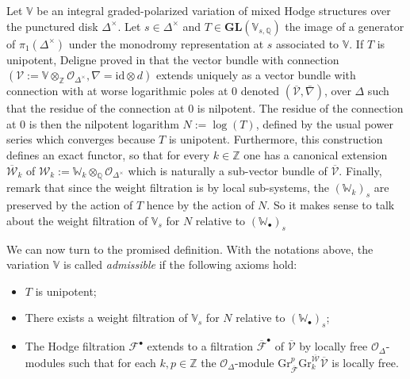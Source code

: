 \documentclass[10pt]{article}
\numberwithin{equation}{subsection}
\theoremstyle{plain}
\theoremstyle{definition}
\theoremstyle{remark}
\newcommand{\Z}{\mathbb Z}
\newcommand{\Q}{\mathbb Q}
\newcommand{\V}{\mathbb V}
\newcommand{\W}{\mathbb W}
\newcommand{\bul}{\bullet}
\newcommand{\id}{\mathrm{id}}
\newcommand{\gl}{\mathbf{GL}}
\newcommand{\Gr}{\mathrm{Gr}}
\begin{document}
Let $\V$ be an integral graded-polarized variation of mixed Hodge structures over the punctured disk $\Delta^\times$. Let $s \in \Delta^\times$ and $T\in \gl(\V_{s,\Q})$ the image of a generator of $\pi_1(\Delta^\times)$ under the monodromy representation at $s$ associated to $\V$. If $T$ is unipotent, Deligne proved in \cite{deledpsr} that the vector bundle with connection $(\mathcal{V} := \V \otimes_\Z \mathcal{O}_{\Delta^\times}, \nabla = \id \otimes d)$ extends uniquely as a vector bundle with connection with at worse logarithmic poles at $0$ denoted $(\overline{\mathcal{V}}, \bar{\nabla})$, over $\Delta$ such that the residue of the connection at $0$ is nilpotent. The residue of the connection at $0$ is then the nilpotent logarithm $N := \log(T)$, defined by the usual power series which converges because $T$ is unipotent. Furthermore, this construction defines an exact functor, so that for every $k \in \Z$ one has a canonical extension $\overline{\mathcal{W}}_k$ of $\mathcal{W}_k := \W_k \otimes_\Q \mathcal{O}_{\Delta^\times}$ which is naturally a sub-vector bundle of $\overline{\mathcal{V}}$. Finally, remark that since the weight filtration is by local sub-systems, the $(\W_k)_s$ are preserved by the action of $T$ hence by the action of $N$. So it makes sense to talk about the weight filtration of $\V_s$ for $N$ relative to $(\W_\bul)_s$

We can now turn to the promised definition. With the notations above, the variation $\V$ is called \textit{admissible} if the following axioms hold:
\begin{itemize} 
\item[$(A_0)$] $T$ is unipotent;
\item[$(A_1)$] There exists a weight filtration of $\V_s$ for $N$ relative to $(\W_\bul)_s$;
\item[$(A_2)$] The Hodge filtration $\mathcal{F}^\bul$ extends to a filtration $\overline{\mathcal{F}}^\bul$ of  $\overline{\mathcal{V}}$ by locally free $\mathcal{O}_\Delta$-modules such that for each $k,p \in \Z$ the $\mathcal{O}_\Delta$-module $\Gr_{\overline{\mathcal{F}}}^p \Gr_k^{\overline{\mathcal{W}}} \overline{\mathcal{V}}$ is locally free.
\end{itemize}
\end{document}
